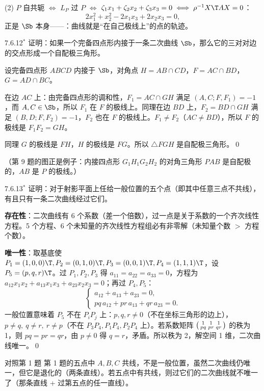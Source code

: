 (2) $P$ 自共轭 $\iff$ $L_P$ 过 $P$ $\iff$ $\zeta_1x_1+\zeta_2x_2+\zeta_3x_3=0\iff \rho^{-1}X\T AX=0$：
\[
2x_1^2+x_2^2-2x_1x_3+2x_2x_3=0 ,
\]
正是 $\Sb$ 本身——：曲线就是“在自己极线上”的点的轨迹。

\begin{ex}{7.6.12$^*$}
证明：如果一个完备四点形内接于一条二次曲线 $\Sb$，那么它的三对对边的交点形成一个自配极三角形。
\end{ex}
\zheng 设完备四点形 $ABCD$ 内接于 $\Sb$，对角点 $H=AB\cap CD$，$F=AC\cap BD$，$G=AD\cap BC$。

在边 $AC$ 上：由完备四点形的调和性，$F_1=AC\cap GH$ 满足 $(A,C;F,F_1)=-1$，而 $A,C\in\Sb$，所以 $F_1$ 在 $F$ 的极线上。同理在边 $BD$ 上，$F_2=BD\cap GH$ 满足 $(B,D;F,F_2)=-1$，$F_2$ 也在 $F$ 的极线上。$F_1\neq F_2$（$AC\neq BD$），所以 $F$ 的极线是 $F_1F_2=GH$。

同理 $G$ 的极线是 $FH$，$H$ 的极线是 $FG$。所以 $\triangle FGH$ 是自配极三角形。\qed

（第 9 题的图正是例子：内接四点形 $G_1H_1G_2H_2$ 的对角三角形 $PAB$ 是自配极的，$AB$ 是 $P$ 的极线。）

\begin{ex}{7.6.13$^*$}
证明：对于射影平面上任给一般位置的五个点（即其中任意三点不共线），有且只有一条二次曲线经过它们。
\end{ex}
\zheng\textbf{存在性}：二次曲线有 6 个系数（差一个倍数），过一点是关于系数的一个齐次线性方程。5 个方程、6 个未知量的齐次线性方程组必有非零解（\gd 未知量个数 $>$ 方程个数）。

\textbf{唯一性}：取基底使 $P_1=(1,0,0)\T,P_2=(0,1,0)\T,P_3=(0,0,1)\T,P_4=(1,1,1)\T$，设 $P_5=(p,q,r)\T$。过 $P_1,P_2,P_3$ 得 $a_{11}=a_{22}=a_{33}=0$，方程为 $a_{12}x_1x_2+a_{13}x_1x_3+a_{23}x_2x_3=0$；再过 $P_4,P_5$：
\[
\begin{cases}a_{12}+a_{13}+a_{23}=0,\\ pq\,a_{12}+pr\,a_{13}+qr\,a_{23}=0 .\end{cases}
\]
一般位置意味着 $P_5$ 不在 $P_iP_j$ 上：$p,q,r\neq0$（不在坐标三角形的边上），$p\neq q,\ q\neq r,\ r\neq p$（不在 $P_3P_4,P_1P_4,P_2P_4$ 上）。若系数矩阵 $\begin{psmallmatrix}1&1&1\\pq&pr&qr\end{psmallmatrix}$ 的秩为 1，则 $pq=pr=qr$，由 $p\neq0$ 得 $q=r$，矛盾。所以秩为 2，解空间 1 维，二次曲线唯一。\qed

\begin{intbox}{对照第 1 题}
第 1 题的五点中 $A,B,C$ 共线，不是一般位置，虽然二次曲线仍唯一，但它是退化的（两条直线）。若五点中有共线，则过它们的二次曲线就不唯一了（那条直线 + 过第五点的任一直线）。
\end{intbox}
